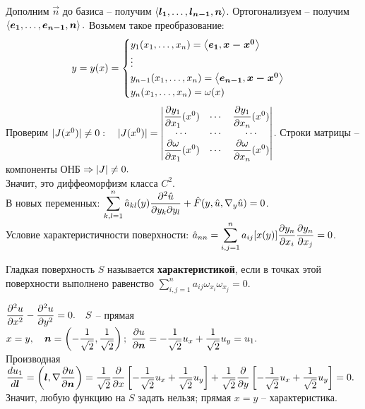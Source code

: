 Дополним $\vec{n}$ до базиса -- получим $\left\langle \boldsymbol{l_1},\dots,\boldsymbol{l_{n-1}},\boldsymbol{n} \right\rangle$. Ортогонализуем -- получим $\left\langle \boldsymbol{e_1},\dots,\boldsymbol{e_{n-1}},\boldsymbol{n} \right\rangle.$ Возьмем такое преобразование:
\[ y = y(x) = \begin{cases} y_1(x_1,\dots,x_n) = \left\langle \boldsymbol{e_1}, \boldsymbol{x-x^0} \right\rangle \\ \vdots \\ y_{n-1}(x_1,\dots,x_n) = \left\langle \boldsymbol{e_{n-1}}, \boldsymbol{x-x^0} \right\rangle \\ y_n(x_1,\dots,x_n) = \omega(x) \end{cases}\]
Проверим $|J(x^0)|\not=0: \quad |J(x^0)| = 
\begin{vmatrix} 
\displaystyle\frac{\partial y_1}{\partial x_1}(x^0) & \cdots & \displaystyle\frac{\partial y_1}{\partial x_n}(x^0) \\
\cdots &\cdots &\cdots \\
\displaystyle\frac{\partial \omega}{\partial x_1}(x^0) & \cdots & \displaystyle\frac{\partial \omega}{\partial x_n}(x^0) \\
\end{vmatrix} $. Строки матрицы -- компоненты ОНБ $\Rightarrow |J|\not= 0.$\\
Значит, это диффеоморфизм класса $C^2$.\\
В новых переменных: $\displaystyle\sum\limits_{k,l=1}^{n}\hat{a}_{kl}(y)\displaystyle\frac{\partial^2 \hat{u}}{\partial y_k\partial y_l} + \hat{F}(y, \hat{u}, \nabla_y \hat{u}) = 0 $.\\
Условие характеристичности поверхности: $\hat{a}_{nn} = \displaystyle\sum\limits_{i,j=1}^{n} a_{ij}[x(y)]\displaystyle\frac{\partial y_n}{\partial x_i}\displaystyle\frac{\partial y_n}{\partial x_j} = 0$.

\begin{definition}
Гладкая поверхность $S$ называется {\bf характеристикой}, если в точках этой поверхности выполнено равенство  $\displaystyle\sum\limits_{i,j=1}^{n}a_{ij}\omega_{x_i}\omega_{x_{j}} = 0$.
\end{definition}

\begin{example}
$\displaystyle\frac{\partial^{2} u}{\partial x^{2}} - \displaystyle\frac{\partial^{2} u}{\partial y^{2}} = 0.\quad S$ -- прямая $x=y, \quad \boldsymbol{n} = \left(-\dfrac1{\sqrt{2}}, \dfrac1{\sqrt{2}}\right);\ \displaystyle\frac{\partial u}{\partial \boldsymbol{n}} = -\dfrac1{\sqrt2}u_x + \dfrac1{\sqrt{2}}u_y = u_1.$\\
Производная $\displaystyle\frac{d u_1}{d \boldsymbol l} = \left(\boldsymbol{l}, \nabla\displaystyle\frac{\partial u}{\partial \boldsymbol{n}}\right) = \dfrac1{\sqrt{2}}\displaystyle\frac{\partial }{\partial x}\left[-\dfrac1{\sqrt2}u_x + \dfrac1{\sqrt{2}}u_y\right] + \dfrac1{\sqrt{2}}\displaystyle\frac{\partial }{\partial y}\left[-\dfrac1{\sqrt2}u_x + \dfrac1{\sqrt{2}}u_y\right] = 0.$
Значит, любую функцию на $S$ задать нельзя; прямая $x=y$ -- характеристика.
\end{example}


